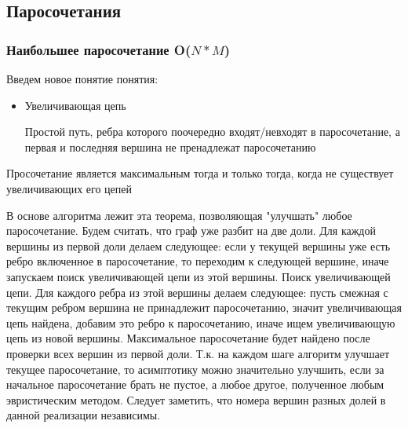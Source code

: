 \subsection{Паросочетания}
\subsubsection{Наибольшее паросочетание O($N*M$)}
Введем новое понятие понятия:
\begin{itemize}
\item 
    Увеличивающая цепь 
    \begin{mydef}
        Простой путь, ребра которого поочередно входят/невходят в паросочетание, а первая и последняя вершина не пренадлежат паросочетанию
    \end{mydef}
\end{itemize}
\begin{theorem}Просочетание является максимальным тогда и только тогда, когда не существует увеличивающих его цепей
\end{theorem}
В основе алгоритма лежит эта теорема, позволяющая "улучшать" любое паросочетание.\newline
Будем считать, что граф уже разбит на две доли. Для каждой вершины из первой доли делаем следующее: если у текущей вершины уже есть ребро включенное в паросочетание, то переходим к следующей вершине, иначе запускаем поиск увеличивающей цепи из этой вершины. 
Поиск увеличивающей цепи. \newline
Для каждого ребра из этой вершины делаем следующее: пусть смежная с текущим ребром вершина не принадлежит паросочетанию, значит увеличивающая цепь найдена, добавим это ребро к паросочетанию, иначе ищем увеличивающую цепь из новой вершины. Максимальное паросочетание будет найдено после проверки всех вершин из первой доли. \newline
Т.к. на каждом шаге алгоритм улучшает текущее паросочетание, то асимптотику можно значительно улучшить, если за начальное паросочетание брать не пустое, а любое другое, полученное любым эвристическим методом.\newline
Следует заметить, что номера вершин разных долей в данной реализации независимы.
